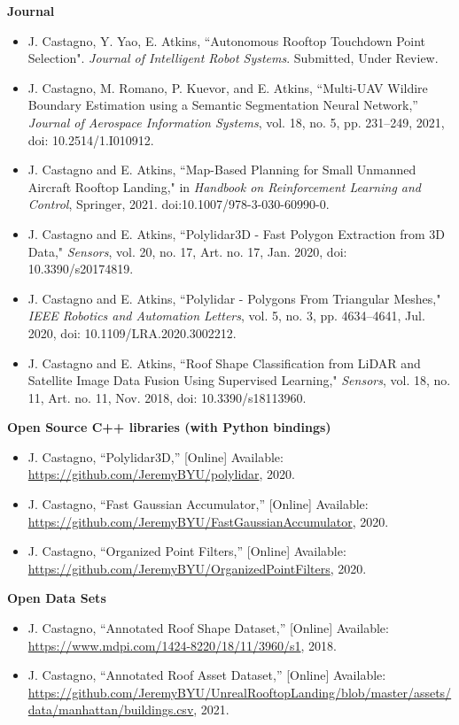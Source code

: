 \vspace{0.25cm}

\textbf{Journal}

\vspace{0.20cm}
\begin{itemize}[noitemsep]
    \item J. Castagno, Y. Yao, E. Atkins, ``Autonomous Rooftop Touchdown Point Selection". \emph{Journal of Intelligent Robot Systems}. Submitted, Under Review. 
    \item J. Castagno, M. Romano, P. Kuevor, and E. Atkins, ``Multi-UAV Wildire Boundary Estimation using a Semantic Segmentation Neural Network,” \emph{Journal of Aerospace Information Systems}, vol. 18, no. 5, pp. 231–249, 2021, doi: 10.2514/1.I010912.
    \item J. Castagno and E. Atkins, ``Map-Based Planning for Small Unmanned Aircraft Rooftop Landing," in \emph{Handbook on Reinforcement Learning and Control}, Springer, 2021. doi:10.1007/978-3-030-60990-0.
    \item J. Castagno and E. Atkins, “Polylidar3D - Fast Polygon Extraction from 3D Data," \emph{Sensors}, vol. 20, no. 17, Art. no. 17, Jan. 2020, doi: 10.3390/s20174819.
    \item J. Castagno and E. Atkins, “Polylidar - Polygons From Triangular Meshes," \emph{IEEE Robotics and Automation Letters}, vol. 5, no. 3, pp. 4634–4641, Jul. 2020, doi: 10.1109/LRA.2020.3002212.
    \item J. Castagno and E. Atkins, “Roof Shape Classification from LiDAR and Satellite Image Data Fusion Using Supervised Learning," \emph{Sensors}, vol. 18, no. 11, Art. no. 11, Nov. 2018, doi: 10.3390/s18113960.
\end{itemize}

\textbf{Open Source C++ libraries (with Python bindings)}

\begin{itemize}[noitemsep]
    \item J. Castagno, ``Polylidar3D,''   [Online]  Available: \url{https://github.com/JeremyBYU/polylidar}, 2020.
    \item J. Castagno, ``Fast Gaussian Accumulator,''   [Online]  Available: \url{https://github.com/JeremyBYU/FastGaussianAccumulator}, 2020.
    \item J. Castagno, ``Organized Point Filters,''   [Online]  Available: \url{https://github.com/JeremyBYU/OrganizedPointFilters}, 2020.
\end{itemize}

\textbf{Open Data Sets}

\begin{itemize}[noitemsep]
    \item J. Castagno, ``Annotated Roof Shape Dataset,''   [Online]  Available: \url{https://www.mdpi.com/1424-8220/18/11/3960/s1}, 2018.
    \item J. Castagno, ``Annotated Roof Asset Dataset,'' [Online] Available: \url{https://github.com/JeremyBYU/UnrealRooftopLanding/blob/master/assets/data/manhattan/buildings.csv}, 2021.
\end{itemize}
